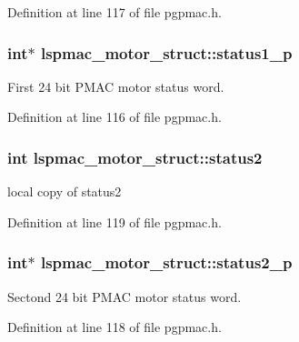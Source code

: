 Definition at line 117 of file pgpmac.\-h.

\hypertarget{structlspmac__motor__struct_a56c41875faf19c643e97c10519e6eb8c}{
\subsubsection[{status1\-\_\-p}]{\setlength{\rightskip}{0pt plus 5cm}int$\ast$ lspmac\-\_\-motor\-\_\-struct\-::status1\-\_\-p}}\label{structlspmac__motor__struct_a56c41875faf19c643e97c10519e6eb8c}


First 24 bit P\-M\-A\-C motor status word. 



Definition at line 116 of file pgpmac.\-h.

\hypertarget{structlspmac__motor__struct_a6a412224c09268c1dc92de9c2a1a2512}{
\subsubsection[{status2}]{\setlength{\rightskip}{0pt plus 5cm}int lspmac\-\_\-motor\-\_\-struct\-::status2}}\label{structlspmac__motor__struct_a6a412224c09268c1dc92de9c2a1a2512}


local copy of status2 



Definition at line 119 of file pgpmac.\-h.

\hypertarget{structlspmac__motor__struct_a2b33ef6e12717459c1e9967cc6e659c6}{
\subsubsection[{status2\-\_\-p}]{\setlength{\rightskip}{0pt plus 5cm}int$\ast$ lspmac\-\_\-motor\-\_\-struct\-::status2\-\_\-p}}\label{structlspmac__motor__struct_a2b33ef6e12717459c1e9967cc6e659c6}


Sectond 24 bit P\-M\-A\-C motor status word. 



Definition at line 118 of file pgpmac.\-h.


